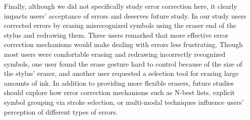 \documentclass{elsart}
\begin{document}
Finally, although we did not specifically study error correction here,
it clearly impacts users' acceptance of errors and deserves future
study.  In our study users corrected errors by erasing misrecognized
symbols using the eraser end of the stylus and redrawing them.  Three
users remarked that more effective error correction mechanisms would
make dealing with errors less frustrating.  Though most users were
comfortable erasing and redrawing incorrectly
recognized symbols, one user found the erase gesture hard to control
because of the size of the stylus' eraser, and another user requested
a selection tool for erasing large amounts of ink.  In addition to
providing more flexible erasers, future studies should explore
how error correction mechanisms such as N-best lists, explicit symbol
grouping via stroke selection, or multi-modal techniques influence
users' perception of different types of errors.





\end{document}
